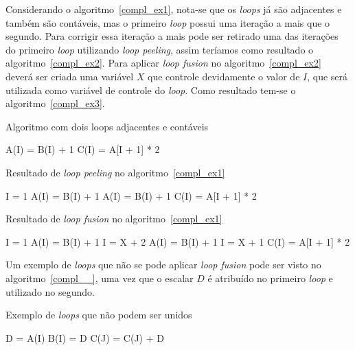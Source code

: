 Considerando o algoritmo~\ref{compl_ex1}, nota-se que os \textit{loops} já são
adjacentes e também são contáveis, mas o primeiro \textit{loop} possui uma
iteração a mais que o segundo. Para corrigir essa iteração a mais pode ser
retirado uma das iterações do primeiro \textit{loop} utilizando 
\textit{loop peeling}, assim teríamos como resultado o algoritmo~\ref{compl_ex2}. 
Para aplicar \textit{loop fusion} no algoritmo~\ref{compl_ex2} deverá ser
criada uma variável $X$ que controle devidamente o valor de $I$, que será utilizada
como variável de controle do \textit{loop}. Como resultado tem-se o
algoritmo~\ref{compl_ex3}.

\begin{algorithm}
\caption{Algoritmo com dois loops adjacentes e contáveis}
\label{compl_ex1}
\begin{algorithmic}[1]

\STATE A(I) = B(I) + 1
\ENDFOR
{}
\STATE C(I) = A[I + 1] * 2
\ENDFOR

\end{algorithmic}
\end{algorithm}

\begin{algorithm}
\caption{Resultado de \textit{loop peeling} no algoritmo~\ref{compl_ex1}}
\label{compl_ex2}
\begin{algorithmic}[1]

\STATE I = 1
\STATE A(I) = B(I) + 1
\STATE A(I) = B(I) + 1
\ENDFOR
{}
\STATE C(I) = A[I + 1] * 2
\ENDFOR

\end{algorithmic}
\end{algorithm}

\begin{algorithm}
\caption{Resultado de \textit{loop fusion} no algoritmo~\ref{compl_ex1}}
\label{compl_ex3}
\begin{algorithmic}[1]

\STATE I = 1
\STATE A(I) = B(I) + 1
\STATE I = X + 2
\STATE A(I) = B(I) + 1
\STATE I = X + 1
\STATE C(I) = A[I + 1] * 2
\ENDFOR

\end{algorithmic}
\end{algorithm}

Um exemplo de \textit{loops} que não se pode aplicar \textit{loop fusion} pode
ser visto no algoritmo~\ref{compl__}, uma vez que o escalar $D$ é atribuído no
primeiro \textit{loop} e utilizado no segundo.

\begin{algorithm}
\caption{Exemplo de \textit{loops} que não podem ser unidos}
\label{compl__}
\begin{algorithmic}[1]

\STATE D = A(I)
\STATE B(I) = D
\ENDFOR
{} 
\STATE C(J) = C(J) + D
\ENDFOR

\end{algorithmic}
\end{algorithm}
